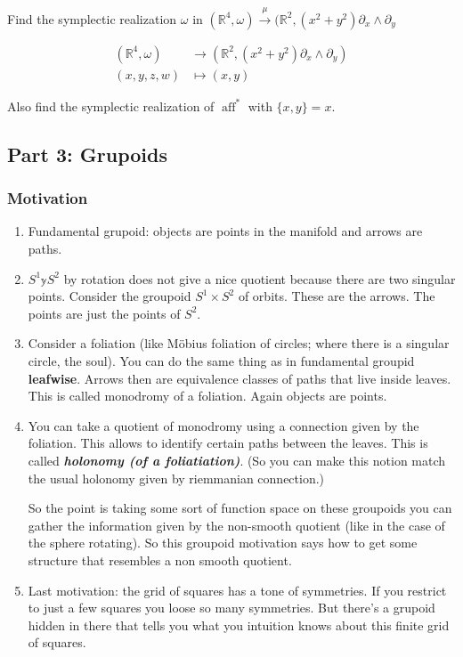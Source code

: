 \begin{exercise}\leavevmode
Find the symplectic realization \(\omega\) in \((\mathbb{R}^4, \omega ) \xrightarrow{\mu}(\mathbb{R}^2,(x^2+y^2)\partial_x \wedge \partial_y\)

\begin{align*}
	(\mathbb{R}^4, \omega) &\longrightarrow (\mathbb{R}^2,(x^2+y^2) \partial_x \wedge \partial _y) \\
	(x,y,z,w) &\longmapsto (x,y)
\end{align*}

Also find the symplectic realization of \(\operatorname{ a f f }^*\) with \(\{x,y\}=x\).
\end{exercise}

\subsection{Part 3: Grupoids}

\subsubsection{Motivation}
\begin{enumerate}
\item Fundamental grupoid: objects are points in the manifold and arrows are paths.
\item \(S^1 \mathbb{y} S^2\) by rotation does not give a nice quotient because there are two singular points. Consider the groupoid  \(S^1 \times S^2\) of orbits. These are the arrows. The points are just the points of \(S^2\).
\item Consider a foliation (like Möbius foliation of circles; where there is a singular circle, the soul). You can do the same thing as in fundamental groupid \textbf{leafwise}. Arrows then are equivalence classes of paths that live inside leaves. This is called monodromy of a foliation. Again objects are points.
\item You can take a quotient of monodromy using a connection given by the foliation. This allows to identify certain paths between the leaves. This is called \textit{\textbf{holonomy (of a foliatiation)}}. (So you can make this notion match the usual holonomy given by riemmanian connection.)
	\begin{upshot}\leavevmode
	So the point is taking some sort of function space on these groupoids you can gather the information given by the non-smooth quotient (like in the case of the sphere rotating). So this groupoid motivation says how to get some structure that resembles a non smooth quotient.
	\end{upshot}
\item Last motivation: the grid of squares has a tone of symmetries. If you restrict to just a few squares you loose so many symmetries. But there's a grupoid hidden in there that tells you what you intuition knows about this finite grid of squares.
\end{enumerate}

